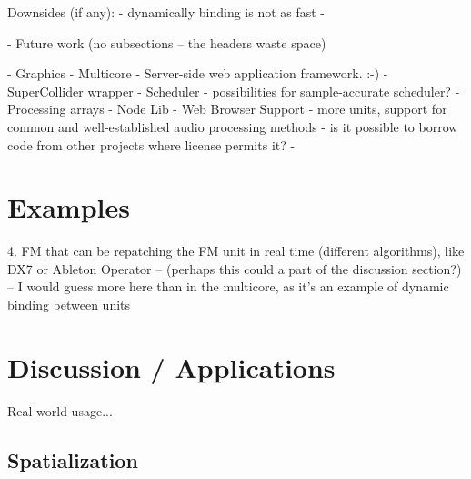 \documentclass[twoside,10pt]{article}
\begin{document}
    Downsides (if any):
        -  dynamically binding is not as fast
        - 
    
- Future work (no subsections -- the headers waste space)

    - Graphics
    - Multicore
    - Server-side web application framework. :-)
    - SuperCollider wrapper
    - Scheduler - possibilities for sample-accurate scheduler?
    - Processing arrays
    - Node Lib
    - Web Browser Support
    - more units, support for common and well-established audio processing methods -  is it possible to borrow code from other projects where license permits it?
    - 
    

    
    





\section{Examples} %

4. FM that can be repatching the FM unit in real time (different algorithms), like DX7 or Ableton Operator  -- (perhaps this could a part of the discussion section?) -- I would guess more here than in the multicore, as it's an example of dynamic binding between units






\section{Discussion / Applications} %

Real-world usage...

\subsection{Spatialization}

\end{document}
